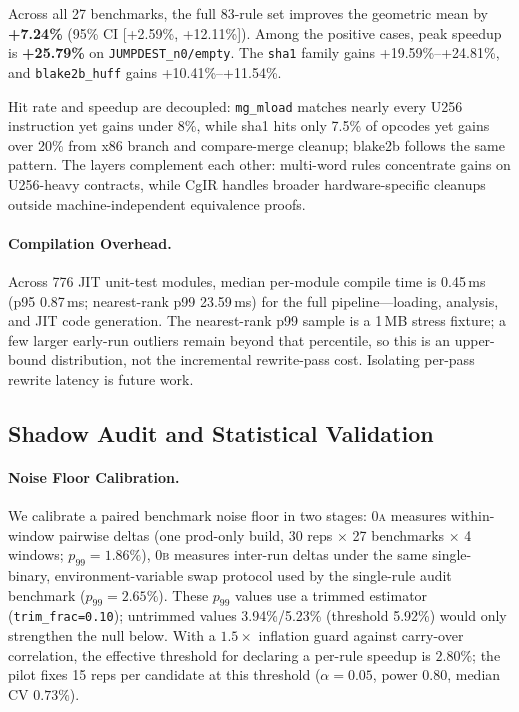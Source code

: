 

{\sloppy
Across all 27 benchmarks, the full 83-rule set improves the geometric
mean by \textbf{+7.24\%} (95\% CI [+2.59\%, +12.11\%]). Among the
positive cases, peak speedup is \textbf{+25.79\%} on
\texttt{JUMPDEST\_n0/}\allowbreak\texttt{empty}. The \texttt{sha1}
family gains +19.59\%--+24.81\%, and
\texttt{blake2b\_}\allowbreak\texttt{huff} gains +10.41\%--+11.54\%.\par}
\noindent
Hit rate and speedup are decoupled: \texttt{mg\_mload} matches nearly
every U256 instruction yet gains under 8\%, while sha1 hits only 7.5\%
of opcodes yet gains over 20\% from x86 branch and compare-merge cleanup;
blake2b follows the same pattern. The layers complement each other:
multi-word rules concentrate gains on U256-heavy contracts, while CgIR
handles broader hardware-specific cleanups outside machine-independent
equivalence proofs.

\paragraph{Compilation Overhead.}
{\sloppy
Across 776 JIT unit-test modules, median per-module compile time is
0.45\,ms (p95 0.87\,ms; nearest-rank p99 23.59\,ms) for the full
pipeline---loading, analysis, and JIT code generation. The nearest-rank
p99 sample is a 1\,MB stress fixture; a few larger early-run outliers
remain beyond that percentile, so this is an upper-bound distribution,
not the incremental rewrite-pass cost. Isolating per-pass rewrite latency
is future work.\par}

\subsection{Shadow Audit and Statistical Validation}
\label{sec:shadow-audit}

\paragraph{Noise Floor Calibration.}
{\sloppy
We calibrate a paired benchmark noise floor in two stages: \textsc{0a}
measures within-window pairwise deltas (one prod-only build, 30 reps
$\times$ 27 benchmarks $\times$ 4 windows; $p_{99} = \mathbf{1.86\%}$),
\textsc{0b} measures inter-run deltas under the same
single-binary, environment-variable swap protocol used by the single-rule
audit benchmark ($p_{99} = \mathbf{2.65\%}$). These $p_{99}$ values use a
trimmed estimator (\texttt{trim\_frac=0.10}); untrimmed values
3.94\%/5.23\% (threshold 5.92\%) would only strengthen the null below.
With a $1.5\times$ inflation guard against carry-over correlation, the
effective threshold for declaring a per-rule speedup is
$\boldsymbol{2.80\%}$; the pilot fixes 15 reps per candidate at this
threshold ($\alpha{=}0.05$, power $0.80$, median CV $0.73\%$).\par}

